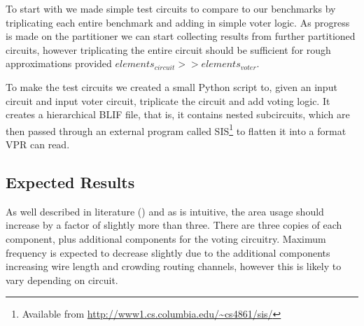 \documentclass[12pt,final,oneside]{memoir} %
\begin{document}
To start with we made simple test circuits to compare to our benchmarks by triplicating each entire benchmark and adding in simple voter logic. As progress is made on the partitioner we can start collecting results from further partitioned circuits, however triplicating the entire circuit should be sufficient for rough approximations provided $elements_{circuit} >> elements_{voter}$.

To make the test circuits we created a small Python script to, given an input circuit and input voter circuit, triplicate the circuit and add voting logic. It creates a hierarchical \ac{BLIF} file, that is, it contains nested subcircuits, which are then passed through an external program called \ac{SIS}\footnote{Available from \url{http://www1.cs.columbia.edu/~cs4861/sis/}} to flatten it into a format \ac{VPR} can read.

\subsection{Expected Results}
As well described in literature (\cite{HardeningTechniques}) and as is intuitive, the area usage should increase by a factor of slightly more than three. There are three copies of each component, plus additional components for the voting circuitry. Maximum frequency is expected to decrease slightly due to the additional components increasing wire length and crowding routing channels, however this is likely to vary depending on circuit.
\end{document}
